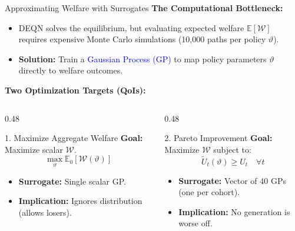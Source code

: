 \documentclass[10pt,aspectratio=169]{beamer}
\begin{document}
\begin{frame}{Approximating Welfare with Surrogates}
\small
    \textbf{The Computational Bottleneck:}
    \begin{itemize}
        \item DEQN solves the equilibrium, but evaluating expected welfare $\mathbb{E}[\mathcal{W}]$ requires expensive Monte Carlo simulations (10,000 paths per policy $\vartheta$).
        \item \textbf{Solution:} Train a \textcolor{blue}{Gaussian Process (GP)} to map policy parameters $\vartheta$ directly to welfare outcomes.
    \end{itemize}
    \vspace{0.1em}
    \textbf{Two Optimization Targets (QoIs):}
    \begin{columns}[t]
        \begin{column}{0.48\textwidth}
            \begin{block}{1. Maximize Aggregate Welfare}
                \small
                \textbf{Goal:} Maximize scalar $\mathcal{W}$.
                \[ \max_\vartheta \mathbb{E}_0[\mathcal{W}(\vartheta)] \]
                \begin{itemize}
                    \item \textbf{Surrogate:} Single scalar GP.
                    \item \textbf{Implication:} Ignores distribution (allows losers).
                \end{itemize}
            \end{block}
        \end{column}
        \begin{column}{0.48\textwidth}
            \begin{block}{2. Pareto Improvement}
                \small
                \textbf{Goal:} Maximize $\mathcal{W}$ subject to:
                \[ \tilde{U}_t(\vartheta) \ge U_t \quad \forall t \]
                \begin{itemize}
                    \item \textbf{Surrogate:} Vector of 40 GPs (one per cohort).
                    \item \textbf{Implication:} No generation is worse off.
                \end{itemize}
            \end{block}
        \end{column}
    \end{columns}
\end{frame}
\end{document}
